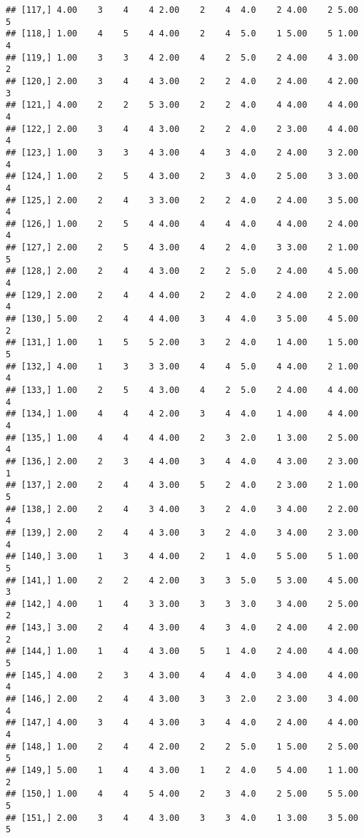 \documentclass[]{article}
\begin{document}
\begin{verbatim}
## [117,] 4.00    3    4    4 2.00    2    4  4.0    2 4.00    2 5.00    5
## [118,] 1.00    4    5    4 4.00    2    4  5.0    1 5.00    5 1.00    4
## [119,] 1.00    3    3    4 2.00    4    2  5.0    2 4.00    4 3.00    2
## [120,] 2.00    3    4    4 3.00    2    2  4.0    2 4.00    4 2.00    3
## [121,] 4.00    2    2    5 3.00    2    2  4.0    4 4.00    4 4.00    4
## [122,] 2.00    3    4    4 3.00    2    2  4.0    2 3.00    4 4.00    4
## [123,] 1.00    3    3    4 3.00    4    3  4.0    2 4.00    3 2.00    4
## [124,] 1.00    2    5    4 3.00    2    3  4.0    2 5.00    3 3.00    4
## [125,] 2.00    2    4    3 3.00    2    2  4.0    2 4.00    3 5.00    4
## [126,] 1.00    2    5    4 4.00    4    4  4.0    4 4.00    2 4.00    4
## [127,] 2.00    2    5    4 3.00    4    2  4.0    3 3.00    2 1.00    5
## [128,] 2.00    2    4    4 3.00    2    2  5.0    2 4.00    4 5.00    4
## [129,] 2.00    2    4    4 4.00    2    2  4.0    2 4.00    2 2.00    4
## [130,] 5.00    2    4    4 4.00    3    4  4.0    3 5.00    4 5.00    2
## [131,] 1.00    1    5    5 2.00    3    2  4.0    1 4.00    1 5.00    5
## [132,] 4.00    1    3    3 3.00    4    4  5.0    4 4.00    2 1.00    4
## [133,] 1.00    2    5    4 3.00    4    2  5.0    2 4.00    4 4.00    4
## [134,] 1.00    4    4    4 2.00    3    4  4.0    1 4.00    4 4.00    4
## [135,] 1.00    4    4    4 4.00    2    3  2.0    1 3.00    2 5.00    4
## [136,] 2.00    2    3    4 4.00    3    4  4.0    4 3.00    2 3.00    1
## [137,] 2.00    2    4    4 3.00    5    2  4.0    2 3.00    2 1.00    5
## [138,] 2.00    2    4    3 4.00    3    2  4.0    3 4.00    2 2.00    4
## [139,] 2.00    2    4    4 3.00    3    2  4.0    3 4.00    2 3.00    4
## [140,] 3.00    1    3    4 4.00    2    1  4.0    5 5.00    5 1.00    5
## [141,] 1.00    2    2    4 2.00    3    3  5.0    5 3.00    4 5.00    3
## [142,] 4.00    1    4    3 3.00    3    3  3.0    3 4.00    2 5.00    2
## [143,] 3.00    2    4    4 3.00    4    3  4.0    2 4.00    4 2.00    2
## [144,] 1.00    1    4    4 3.00    5    1  4.0    2 4.00    4 4.00    5
## [145,] 4.00    2    3    4 3.00    4    4  4.0    3 4.00    4 4.00    4
## [146,] 2.00    2    4    4 3.00    3    3  2.0    2 3.00    3 4.00    4
## [147,] 4.00    3    4    4 3.00    3    4  4.0    2 4.00    4 4.00    4
## [148,] 1.00    2    4    4 2.00    2    2  5.0    1 5.00    2 5.00    5
## [149,] 5.00    1    4    4 3.00    1    2  4.0    5 4.00    1 1.00    2
## [150,] 1.00    4    4    5 4.00    2    3  4.0    2 5.00    5 5.00    5
## [151,] 2.00    3    4    4 3.00    3    3  4.0    1 3.00    3 5.00    5

\end{verbatim}
\end{document}
